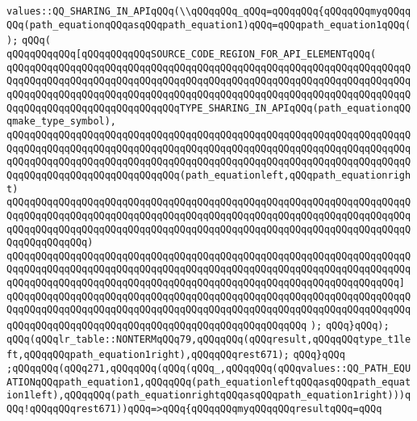 \verb|values::QQ_SHARING_IN_APIqQQq(\\qQQqqQQq_qQQq=qQQqqQQq{qQQqqQQqmyqQQqqQQq(path_equationqQQqasqQQqpath_equation1)qQQq=qQQqpath_equation1qQQq();|\newline
\verb|qQQq(|\newline
\verb|qQQqqQQqqQQq[qQQqqQQqqQQqSOURCE_CODE_REGION_FOR_API_ELEMENTqQQq(|\newline
\verb|qQQqqQQqqQQqqQQqqQQqqQQqqQQqqQQqqQQqqQQqqQQqqQQqqQQqqQQqqQQqqQQqqQQqqQQqqQQqqQQqqQQqqQQqqQQqqQQqqQQqqQQqqQQqqQQqqQQqqQQqqQQqqQQqqQQqqQQqqQQqqQQqqQQqqQQqqQQqqQQqqQQqqQQqqQQqqQQqqQQqqQQqqQQqqQQqqQQqqQQqqQQqqQQqqQQqqQQqqQQqqQQqqQQqqQQqqQQqqQQqTYPE_SHARING_IN_APIqQQq(path_equationqQQqmake_type_symbol),|\newline
\verb|qQQqqQQqqQQqqQQqqQQqqQQqqQQqqQQqqQQqqQQqqQQqqQQqqQQqqQQqqQQqqQQqqQQqqQQqqQQqqQQqqQQqqQQqqQQqqQQqqQQqqQQqqQQqqQQqqQQqqQQqqQQqqQQqqQQqqQQqqQQqqQQqqQQqqQQqqQQqqQQqqQQqqQQqqQQqqQQqqQQqqQQqqQQqqQQqqQQqqQQqqQQqqQQqqQQqqQQqqQQqqQQqqQQqqQQqqQQqqQQq(path_equationleft,qQQqpath_equationright)|\newline
\verb|qQQqqQQqqQQqqQQqqQQqqQQqqQQqqQQqqQQqqQQqqQQqqQQqqQQqqQQqqQQqqQQqqQQqqQQqqQQqqQQqqQQqqQQqqQQqqQQqqQQqqQQqqQQqqQQqqQQqqQQqqQQqqQQqqQQqqQQqqQQqqQQqqQQqqQQqqQQqqQQqqQQqqQQqqQQqqQQqqQQqqQQqqQQqqQQqqQQqqQQqqQQqqQQqqQQqqQQqqQQqqQQq)|\newline
\verb|qQQqqQQqqQQqqQQqqQQqqQQqqQQqqQQqqQQqqQQqqQQqqQQqqQQqqQQqqQQqqQQqqQQqqQQqqQQqqQQqqQQqqQQqqQQqqQQqqQQqqQQqqQQqqQQqqQQqqQQqqQQqqQQqqQQqqQQqqQQqqQQqqQQqqQQqqQQqqQQqqQQqqQQqqQQqqQQqqQQqqQQqqQQqqQQqqQQqqQQqqQQqqQQq]|\newline
\verb|qQQqqQQqqQQqqQQqqQQqqQQqqQQqqQQqqQQqqQQqqQQqqQQqqQQqqQQqqQQqqQQqqQQqqQQqqQQqqQQqqQQqqQQqqQQqqQQqqQQqqQQqqQQqqQQqqQQqqQQqqQQqqQQqqQQqqQQqqQQqqQQqqQQqqQQqqQQqqQQqqQQqqQQqqQQqqQQqqQQqqQQqqQQqqQQq|\newline
\verb|);|\newline
\verb|qQQq}qQQq);|\newline
\verb|qQQq(qQQqlr_table::NONTERMqQQq79,qQQqqQQq(qQQqresult,qQQqqQQqtype_t1left,qQQqqQQqpath_equation1right),qQQqqQQqrest671);|\newline
\verb|qQQq}qQQq|\newline
\verb|;qQQqqQQq(qQQq271,qQQqqQQq(qQQq(qQQq_,qQQqqQQq(qQQqvalues::QQ_PATH_EQUATIONqQQqpath_equation1,qQQqqQQq(path_equationleftqQQqasqQQqpath_equation1left),qQQqqQQq(path_equationrightqQQqasqQQqpath_equation1right)))qQQq!qQQqqQQqrest671))qQQq=>qQQq{qQQqqQQqmyqQQqqQQqresultqQQq=qQQq|\newline
